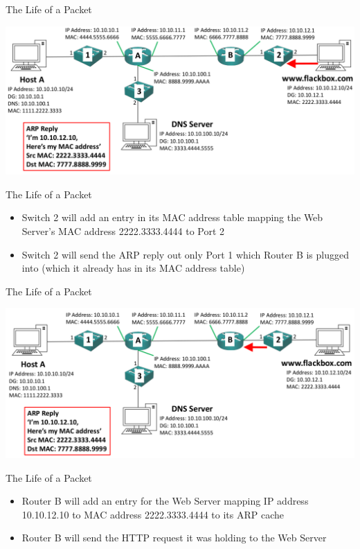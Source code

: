 \documentclass[pdflatex,compress,mathserif]{beamer}
\begin{document}
\begin{frame}{The Life of a Packet}
	\begin{center}
		\includegraphics[width=\linewidth]{img/img51}
	\end{center}
\end{frame}

\begin{frame}{The Life of a Packet}
	\begin{itemize}
		\item Switch 2 will add an entry in its MAC address table mapping the Web Server’s MAC address 2222.3333.4444 to Port 2
		\item Switch 2 will send the ARP reply out only Port 1 which Router B is plugged into (which it already has in its MAC address table)
	\end{itemize}
\end{frame}

\begin{frame}{The Life of a Packet}
	\begin{center}
		\includegraphics[width=\linewidth]{img/img52}
	\end{center}
\end{frame}

\begin{frame}{The Life of a Packet}
	\begin{itemize}
		\item Router B will add an entry for the Web Server mapping IP address 10.10.12.10 to MAC address 2222.3333.4444 to its ARP cache
		\item Router B will send the HTTP request it was holding to the Web Server
	\end{itemize}
\end{frame}
\end{document}
